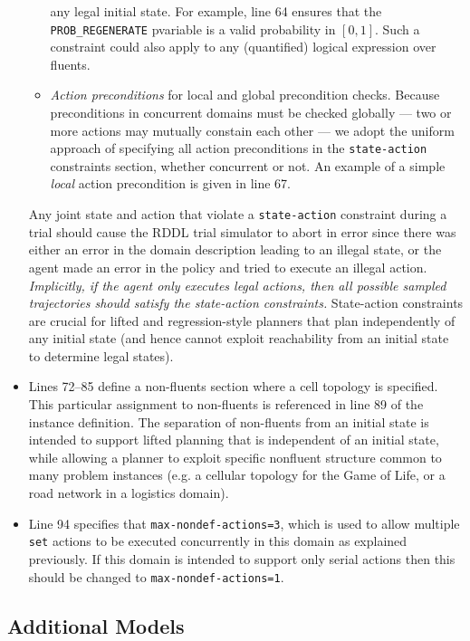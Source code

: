 \documentclass[11pt,a4paper]{article}
\begin{document}
\begin{itemize}
\begin{itemize}
any legal initial state.  For example, line 64 ensures that the
\texttt{PROB\_REGENERATE} pvariable is a valid probability in $[0,1]$.
Such a constraint could also apply to any (quantified)
logical expression over fluents.
\item \emph{Action preconditions} for local and global precondition
checks.  Because preconditions in concurrent domains
must be checked globally --- two or more actions may mutually constain
each other --- we adopt the uniform approach of specifying
all action preconditions in the
\texttt{state-action} constraints section, whether concurrent or not.
An example of a simple \emph{local}
action precondition is given in line 67.
\end{itemize}
Any joint state and action that violate a \texttt{state-action}
constraint during a trial should cause the RDDL trial simulator
to abort in error since there was either an error in the domain
description leading to an illegal state, or the agent made an
error in the policy and tried to execute an illegal action.
\emph{Implicitly, if the agent only executes legal actions, then all
possible sampled trajectories should satisfy the state-action
constraints.}  State-action constraints are crucial for
lifted and regression-style planners that plan independently
of any initial state (and hence cannot exploit reachability
from an initial state to determine legal states).
\item Lines 72--85 define a non-fluents section where a cell topology
is specified.  This particular assignment to non-fluents is referenced
in line 89 of the instance definition.  The separation of non-fluents
from an initial state is intended to support lifted planning that is 
independent of an initial state, while allowing a planner to exploit
specific nonfluent structure common to many problem instances
(e.g. a cellular topology for the Game of Life, or a road network
in a logistics domain).
\item Line 94 specifies that \texttt{max-nondef-actions=3}, which
is used to allow multiple \texttt{set} actions to be executed
concurrently in this domain as explained previously.  If this
domain is intended to support only serial actions then 
this should be changed to \texttt{max-nondef-actions=1}.
\end{itemize}

\subsection{Additional Models}
\end{document}
